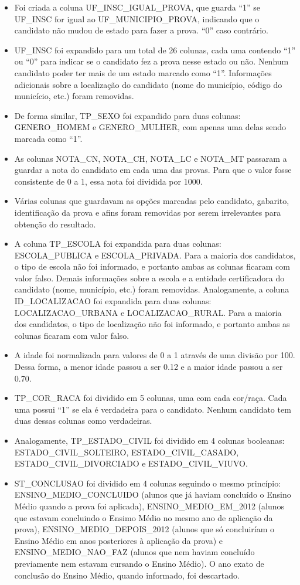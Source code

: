 \documentclass[12pt]{article}
\begin{document}
\begin{itemize}
    \item Foi criada a coluna UF\_INSC\_IGUAL\_PROVA, que guarda ``1'' se UF\_INSC for igual ao UF\_MUNICIPIO\_PROVA, indicando que o candidato não mudou de estado para fazer a prova. ``0'' caso contrário.
    \item UF\_INSC foi expandido para um total de 26 colunas, cada uma contendo ``1'' ou ``0'' para indicar se o candidato fez a prova nesse estado ou não. Nenhum candidato poder ter mais de um estado marcado como ``1''. Informações adicionais sobre a localização do candidato (nome do município, código do municício, etc.) foram removidas.
    \item De forma similar, TP\_SEXO foi expandido para duas colunas: GENERO\_HOMEM e GENERO\_MULHER, com apenas uma delas sendo marcada como ``1''.
    \item As colunas NOTA\_CN, NOTA\_CH, NOTA\_LC e NOTA\_MT passaram a guardar a nota do candidato em cada uma das provas. Para que o valor fosse consistente de 0 a 1, essa nota foi dividida por 1000.
    \item Várias colunas que guardavam as opções marcadas pelo candidato, gabarito, identificação da prova e afins foram removidas por serem irrelevantes para obtenção do resultado.
    \item A coluna TP\_ESCOLA foi expandida para duas colunas: ESCOLA\_PUBLICA e ESCOLA\_PRIVADA. Para a maioria dos candidatos, o tipo de escola não foi informado, e portanto ambas as colunas ficaram com valor falso. Demais informações sobre a escola e a entidade certificadora do candidato (nome, município, etc.) foram removidas.
    Analogamente, a coluna  ID\_LOCALIZACAO foi expandida para duas colunas: LOCALIZACAO\_URBANA e LOCALIZACAO\_RURAL. Para a maioria dos candidatos, o tipo de localização não foi informado, e portanto ambas as colunas ficaram com valor falso.
    \item A idade foi normalizada para valores de 0 a 1 através de uma divisão por 100. Dessa forma, a menor idade passou a ser 0.12 e a maior idade passou a ser 0.70.
    \item TP\_COR\_RACA foi dividido em 5 colunas, uma com cada cor/raça. Cada uma possui ``1'' se ela é verdadeira para o candidato. Nenhum candidato tem duas dessas colunas como verdadeiras.
    \item Analogamente, TP\_ESTADO\_CIVIL foi dividido em 4 colunas booleanas: ESTADO\_CIVIL\_SOLTEIRO, ESTADO\_CIVIL\_CASADO, ESTADO\_CIVIL\_DIVORCIADO e ESTADO\_CIVIL\_VIUVO.
    \item ST\_CONCLUSAO foi dividido em 4 colunas seguindo o mesmo princípio: ENSINO\_MEDIO\_CONCLUIDO (alunos que já haviam concluído o Ensino Médio quando a prova foi aplicada), ENSINO\_MEDIO\_EM\_2012 (alunos que estavam concluindo o Ensimo Médio no mesmo ano de aplicação da prova), ENSINO\_MEDIO\_DEPOIS\_2012 (alunos que só concluiríam o Ensino Médio em anos posteriores à aplicação da prova) e ENSINO\_MEDIO\_NAO\_FAZ (alunos que nem haviam concluído previamente nem estavam cursando o Ensino Médio). O ano exato de conclusão do Ensino Médio, quando informado, foi descartado.
\end{itemize}
\end{document}
